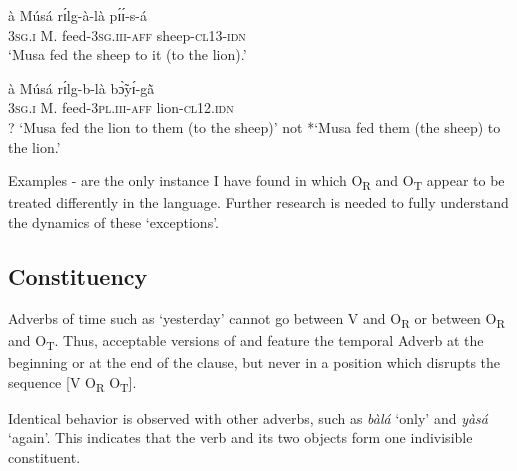 \documentclass[output=paper]{langsci/langscibook}
\begin{document}
\ea
\label{ex:29.pacchiarotti}
\gll à    Músá    rɪ́lg-à-là    pɪ́ɪ́-s-á\\
\textsc{3sg.i}    M.    feed-\textsc{3sg.iii-aff}  sheep-\textsc{cl13-idn}\\
\glt `Musa fed the sheep to it (to the lion).'
\z

\ea
\label{ex:30.pacchiarotti}
\gll à    Músá  rɪ́lg-b-là     bɔ̃̀yɪ́-g\`{ã} \\
\textsc{3sg.i}    M.  feed-\textsc{3pl.iii-aff}    lion-\textsc{cl12.idn}\\
\glt
? `Musa fed the lion to them (to the sheep)' not *`Musa fed them (the sheep) to the lion.'  
\z

Examples - are the only instance I have found in which O\textsubscript{R} and O\textsubscript{T} appear to be treated differently in the language. Further research is needed to fully understand the dynamics of these `exceptions'.

\subsection{Constituency}\label{§4.5:constituency.pacchiarotti}

Adverbs of time such as `yesterday' cannot go between V and O\textsubscript{R} or between O\textsubscript{R} and O\textsubscript{T}. Thus, acceptable versions of  and  feature the temporal Adverb at the beginning or at the end of the clause, but never in a position which disrupts the sequence [V O\textsubscript{R} O\textsubscript{T}].

\z

\z

Identical behavior is observed with other adverbs, such as \textit{bàlá} `only' and \textit{yàsá} `again'. This indicates that the verb and its two objects form one indivisible constituent.
\end{document}
